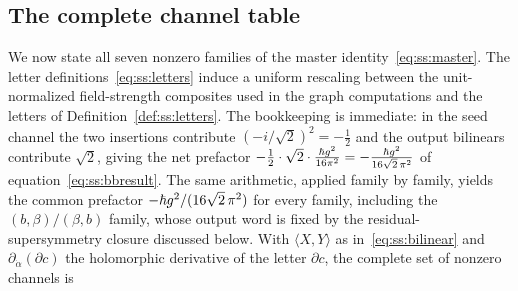 \subsection{The complete channel table}\label{sec:superspace:table}

We now state all seven nonzero families of the master
identity~\eqref{eq:ss:master}. The letter
definitions~\eqref{eq:ss:letters} induce a uniform rescaling between the
unit-normalized field-strength composites used in the graph computations and
the letters of Definition~\ref{def:ss:letters}. The bookkeeping is immediate:
in the seed channel the two insertions contribute $(-i/\sqrt2)^2=-\tfrac12$
and the output bilinears contribute $\sqrt2$, giving the net prefactor
$-\tfrac12\cdot\sqrt2\cdot\tfrac{\hbar g^2}{16\pi^2}
=-\tfrac{\hbar g^{2}}{16\sqrt2\,\pi^{2}}$ of equation~\eqref{eq:ss:bbresult}.
The same arithmetic, applied family by family, yields the common prefactor
$-\hbar g^{2}/(16\sqrt2\,\pi^{2})$ for every family, including the
$(b,\beta)/(\beta,b)$ family, whose output word is fixed by the
residual-supersymmetry closure discussed below.
With $\langle X,Y\rangle$ as in~\eqref{eq:ss:bilinear} and
$\partial_{\dot\alpha}(\partial c)$ the holomorphic derivative of the letter
$\partial c$, the complete set of nonzero channels is
